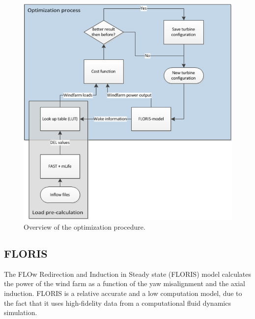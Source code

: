 	
	
	\begin{figure}
		\includegraphics[width=\linewidth]{./Figures/OptimizationProcess.png}
		\caption{Overview of the optimization procedure.}
		\label{fig:optim}
	\end{figure}


  


\subsection{FLORIS} The FLOw Redirection and Induction in Steady state (FLORIS) model calculates the power of the wind farm as a function of the yaw misalignment and the axial induction. \cite{Gebraad2016}
FLORIS is a relative accurate\cite{Dijk2016} and a low computation model, due to the fact that it uses high-fidelity data from a computational fluid dynamics simulation. 

